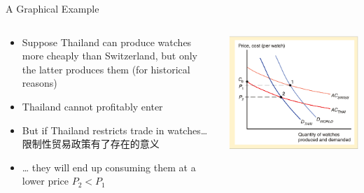 \documentclass[10pt,hyperref={CJKbookmarks=true},xcolor=dvipsnames,aspectratio=169]{beamer}
\begin{document}
\begin{frame}{A Graphical Example }


\begin{columns}[onlytextwidth]
\begin{column}{0.5\textwidth}
\begin{itemize}
\item Suppose Thailand can produce watches more cheaply than Switzerland,
but only the latter produces them (for historical reasons) 
\item Thailand cannot profitably enter 
\item But if Thailand restricts trade in watches… 限制性贸易政策有了存在的意义
\item … they will end up consuming them at a lower price $P_{2}<P_{1}$ 
\end{itemize}

\end{column}
\begin{column}{0.5\textwidth}
\includegraphics[width=\columnwidth]{fig/krugman/lec6-10}
\end{column}
\end{columns}

\end{frame}
\end{document}
